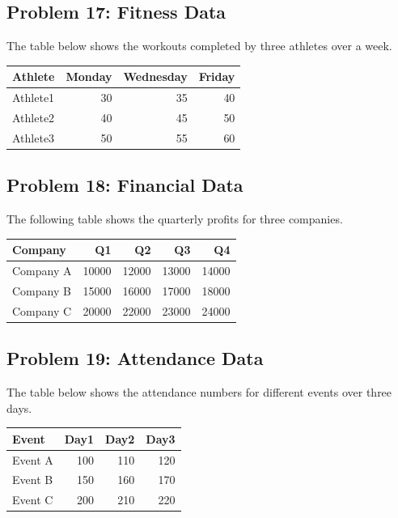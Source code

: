 \documentclass[
  letterpaper,
  DIV=11,
  numbers=noendperiod]{scrreprt}
\begin{document}
\subsection*{Problem 17: Fitness Data}\label{problem-17-fitness-data}

The table below shows the workouts completed by three athletes over a
week.

\begin{table}
\centering
\begin{tabular}{l|r|r|r}
\hline
Athlete & Monday & Wednesday & Friday\\
\hline
Athlete1 & 30 & 35 & 40\\
\hline
Athlete2 & 40 & 45 & 50\\
\hline
Athlete3 & 50 & 55 & 60\\
\hline
\end{tabular}
\end{table}

\subsection*{Problem 18: Financial
Data}\label{problem-18-financial-data}

The following table shows the quarterly profits for three companies.

\begin{table}
\centering
\begin{tabular}{l|r|r|r|r}
\hline
Company & Q1 & Q2 & Q3 & Q4\\
\hline
Company A & 10000 & 12000 & 13000 & 14000\\
\hline
Company B & 15000 & 16000 & 17000 & 18000\\
\hline
Company C & 20000 & 22000 & 23000 & 24000\\
\hline
\end{tabular}
\end{table}

\subsection*{Problem 19: Attendance
Data}\label{problem-19-attendance-data}

The table below shows the attendance numbers for different events over
three days.

\begin{table}
\centering
\begin{tabular}{l|r|r|r}
\hline
Event & Day1 & Day2 & Day3\\
\hline
Event A & 100 & 110 & 120\\
\hline
Event B & 150 & 160 & 170\\
\hline
Event C & 200 & 210 & 220\\
\hline
\end{tabular}
\end{table}
\end{document}

